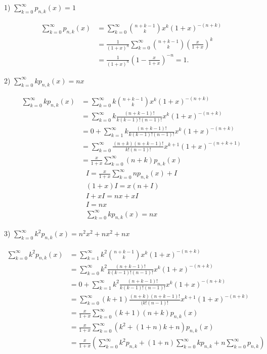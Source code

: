 \begin{english}

1) $\sum_{k=0}^{\infty} p_{n,k}(x) = 1$
\end{english}
	\begin{align*}
		\sum_{k=0}^{\infty} p_{n,k}(x) &= \sum_{k=0}^{\infty} \binom{n+k-1}{k} x^k (1+x)^{-(n+k)} \\
		&= \frac{1}{(1+x)^n} \sum_{k=0}^{\infty} \binom{n+k-1}{k} \left( \frac{x}{1+x} \right)^k \\
		&= \frac{1}{(1+x)^n} \left( 1 - \frac{x}{1+x} \right)^{-n} = 1.
	\end{align*}
	\newpage
\begin{english}
	
	2) $\sum_{k=0}^{\infty}k p_{n,k}(x) = nx$
\end{english}
	\begin{align*}
		\sum_{k=0}^{\infty} k p_{n,k}(x) &= \sum_{k=0}^{\infty} k \binom{n+k-1}{k} x^k (1+x)^{-(n+k)} \\
		&= \sum_{k=0}^{\infty} k \frac{(n+k-1)!}{k(k-1)!(n-1)!} x^k (1+x)^{-(n+k)} \\
		&= 0 + \sum_{k=1}^{\infty} k \frac{(n+k-1)!}{k(k-1)!(n-1)!} x^k (1+x)^{-(n+k)} \\
		&= \sum_{k=0}^{\infty} \frac{(n+k)(n+k-1)!}{k!(n-1)!} x^{k+1} (1+x)^{-(n+k+1)} \\
		&= \frac{x}{1+x} \sum_{k=0}^{\infty} (n+k) p_{n,k}(x)
	\end{align*}
\begin{gather*}
	I = \frac{x}{1+x} \sum_{k=0}^{\infty} n p_{n,k}(x) + I\\
	(1+x) I = x(n+I)\\
	I + xI = nx + xI\\
	I = nx\\
	\sum_{k=0}^{\infty} k p_{n,k}(x) = nx
\end{gather*}
\newpage
\begin{english}
	
	3) $\sum_{k=0}^{\infty}k^2 p_{n,k}(x) = n^2 x^2 + nx^2 + nx$
\end{english}
	\begin{align*}
		\sum_{k=0}^{\infty} k^2 p_{n,k}(x) &= \sum_{k=1}^{\infty} k^2 \binom{n+k-1}{k} x^k (1+x)^{-(n+k)} \\
		&= \sum_{k=0}^{\infty} k^2 \frac{(n+k-1)!}{k(k-1)!(n-1)!} x^k (1+x)^{-(n+k)} \\
		&= 0 + \sum_{k=1}^{\infty} k^2 \frac{(n+k-1)!}{k(k-1)!(n-1)!} x^k (1+x)^{-(n+k)} \\
		&= \sum_{k=0}^{\infty} (k+1) \frac{(n+k)(n+k-1)!}{(k!(n-1)!} x^{k+1} (1+x)^{-(n+k)} \\
		&= \frac{x}{1+x} \sum_{k=0}^{\infty} (k+1)(n+k) p_{n,k}(x)\\
		&= \frac{x}{1+x} \sum_{k=0}^{\infty} (k^2 + (1+n)k + n)p_{n,k}(x)\\
		&= \frac{x}{1+x} \left(
		\sum_{k=0}^{\infty} k^2 p_{n,k} 
		+ (1+n)\sum_{k=0}^{\infty} k p_{n,k} 
		+n\sum_{k=0}^{\infty} p_{n,k} 
		\right)
	\end{align*}
